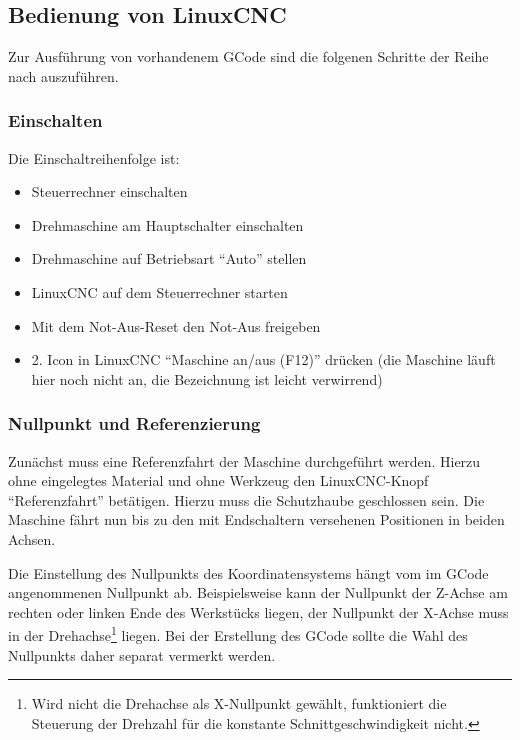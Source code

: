 \documentclass{\basedir/fablab-document}
\begin{document}
\subsection{Bedienung von LinuxCNC}

Zur Ausführung von vorhandenem GCode sind die folgenen Schritte der Reihe nach auszuführen.

\subsubsection{Einschalten}
Die Einschaltreihenfolge ist:
\begin{itemize}
	\item Steuerrechner einschalten
	\item Drehmaschine am Hauptschalter einschalten
	\item Drehmaschine auf Betriebsart \enquote{Auto} stellen
	\item LinuxCNC auf dem Steuerrechner starten
	\item Mit dem Not-Aus-Reset den Not-Aus freigeben
	\item 2. Icon in LinuxCNC "`Maschine an/aus (F12)"' drücken (die Maschine läuft hier noch nicht an, die Bezeichnung ist leicht verwirrend)
\end{itemize}

\subsubsection{Nullpunkt und Referenzierung}

Zunächst muss eine Referenzfahrt der Maschine durchgeführt werden. Hierzu ohne eingelegtes Material und ohne Werkzeug den LinuxCNC-Knopf \enquote{Referenzfahrt} betätigen. Hierzu muss die Schutzhaube geschlossen sein. Die Maschine fährt nun bis zu den mit Endschaltern versehenen Positionen in beiden Achsen.

Die Einstellung des Nullpunkts des Koordinatensystems hängt vom im GCode angenommenen Nullpunkt ab. Beispielsweise kann der Nullpunkt der Z-Achse am rechten oder linken Ende des Werkstücks liegen, der Nullpunkt der X-Achse muss in der Drehachse\footnote{Wird nicht die Drehachse als X-Nullpunkt gewählt, funktioniert die Steuerung der Drehzahl für die konstante Schnittgeschwindigkeit nicht.} liegen. Bei der Erstellung des GCode sollte die Wahl des Nullpunkts daher separat vermerkt werden.
\end{document}
